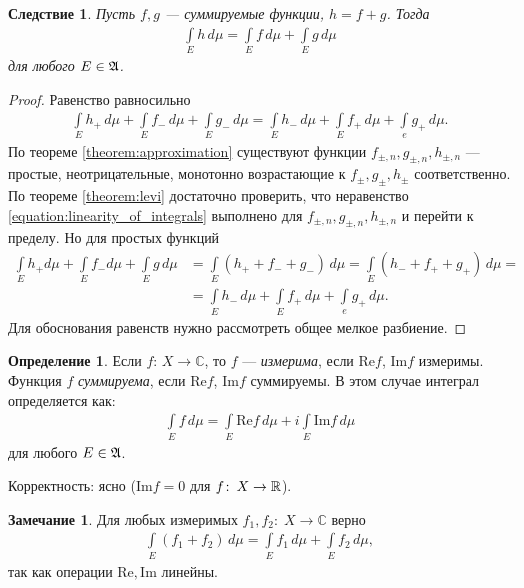 \documentclass[a4paper,14pt]{extarticle}
\newcounter{theoremCnt}
\theoremstyle{definition}
\newtheorem{df}[theoremCnt]{Определение}
\theoremstyle{plain}
\theoremstyle{plain}
\theoremstyle{plain}
\newtheorem{crly}[theoremCnt]{Следствие}
\theoremstyle{plain}
\theoremstyle{definition}
\theoremstyle{definition}
\newtheorem{remrk}[theoremCnt]{Замечание}
\theoremstyle{definition}
\theoremstyle{definition}
\theoremstyle{definition}
\theoremstyle{definition}
\theoremstyle{plain}
\theoremstyle{plain}
\theoremstyle{plain}
\theoremstyle{plain}
\theoremstyle{definition}
\theoremstyle{definition}
\theoremstyle{definition}
\theoremstyle{definition}
\theoremstyle{definition}
\newcommand{\R}{\ensuremath \mathbb{R}}
\newcommand{\A}{\ensuremath \mathfrak{A}}
\begin{document}
\begin{crly}
 Пусть $f,g$ --- суммируемые функции,  $h = f + g$. Тогда \begin{align*}
  \int\limits_E h \, d\mu = \int\limits_E f\, d\mu + \int\limits_E g \, d\mu
 \end{align*} для любого $E \in \A$.
\end{crly}
\begin{proof}
 Равенство равносильно 
 \begin{align}
 \label{equation:linearity_of_integrals}
  \int\limits_E h_+ \, d\mu + \int\limits_E f_- \, d\mu + \int\limits_E g_- \, d\mu = \int\limits_E h_- \, d\mu + \int\limits_E f_+ \, d\mu + \int\limits_e g_+ \, d\mu
 .\end{align} По теореме \ref{theorem:approximation} существуют функции $f_{\pm,n}, g_{\pm,n}, h_{\pm,n}$ --- простые, неотрицательные, монотонно возрастающие к  $f_{\pm}, g_{\pm}, h_{\pm}$ соответственно. По теореме \ref{theorem:levi} достаточно проверить, что неравенство \eqref{equation:linearity_of_integrals} выполнено для $f_{\pm,n}, g_{\pm,n}, h_{\pm,n}$ и перейти к пределу. Но для простых функций \begin{align*}
 \int\limits_E h_+ d\mu + \int\limits_E f_- d\mu + \int\limits_E g\,d\mu &= \int\limits_E \left( h_+ + f_- + g_- \right) \,d\mu = \int\limits_E \left( h_- + f_+ + g_+ \right) \, d\mu = \\
  &= \int\limits_E h_- \, d\mu + \int\limits_E f_+ \, d\mu + \int\limits_e g_+ \, d\mu
 .\end{align*} Для обоснования равенств нужно рассмотреть общее мелкое разбиение.
\end{proof}
\begin{df}
 Если  $f \colon\, X \to \mathbb{C} $, то $f$ --- \textit{измерима}, если $\mathrm{Re} f$,  $\mathrm{Im} f$ измеримы. Функция  $f$ \textit{суммируема}, если $\mathrm{Re} f$,  $\mathrm{Im} f$ суммируемы. В этом случае интеграл определяется как: \begin{align*}
  \int\limits_E f \, d\mu = \int\limits_E \mathrm{Re} f \, d\mu + i \int\limits_E \mathrm{Im} f \,d\mu
 \end{align*} для любого $E \in \A$.

 Корректность: ясно ($\mathrm{Im} f = 0$ для  $f \colon\, X \to \R  $).
\end{df}
\begin{remrk}
 Для любых измеримых $f_1, f_2 \colon\; X \to \mathbb{C}$ верно
 \begin{align*}
  \int\limits_E (f_1 + f_2) \, d\mu = \int\limits_E f_1 \,d\mu + \int\limits_E f_2 \,d\mu
 ,\end{align*}  так как операции $\mathrm{Re}, \mathrm{Im}$ линейны.
\end{remrk}
\end{document}
